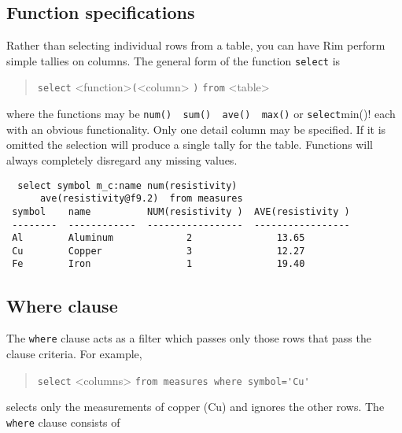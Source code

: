 \documentclass[11pt,a4paper]{report}
\begin{document}
\subsection{Function specifications}
Rather than selecting individual rows from a table, you can
have Rim perform simple tallies on columns.
The general form of the function \verb!select! is
\begin{verse}
\verb!select!  <function>\verb!(!<column> \opt{\ldots}\verb!)!
   \qquad \opt{\ldots} \verb!from! <table>
\end{verse}
where the functions may be
\verb!num()  sum()  ave()  max()! or \verb!select!min()!
each with an obvious functionality.
Only one detail column may be specified.  If it is omitted
the selection will produce a single tally for the table.
Functions will always completely disregard any missing values.

\begin{verbatim}
  select symbol m_c:name num(resistivity)
      ave(resistivity@f9.2)  from measures
 symbol    name          NUM(resistivity )  AVE(resistivity )
 --------  ------------  -----------------  -----------------
 Al        Aluminum             2               13.65
 Cu        Copper               3               12.27
 Fe        Iron                 1               19.40
\end{verbatim}
 
\subsection{Where clause}
%
\label{where-clause}
The \verb!where! clause acts as a filter which passes only
those rows that pass the clause criteria.
For example,
\begin{verse}
\verb!select! <columns> \verb!from measures where symbol='Cu'!
\end{verse}
selects only the measurements of copper (Cu) and ignores
the other rows.
The \verb!where! clause consists of
 
\end{document}
